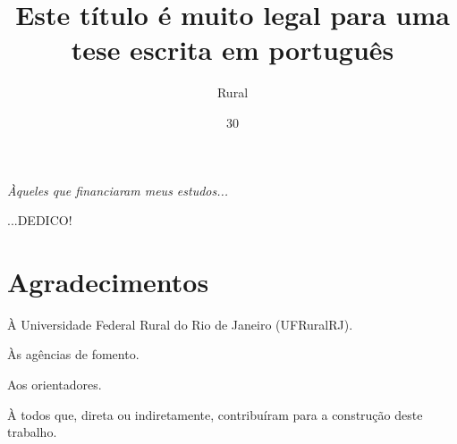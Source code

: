 \documentclass[tese]{UFRuralRJ}
\title{Este título é muito legal para uma tese escrita em português} %
\author{Rural}{Nome do Melhor Estudante da} %
\date{30}{Fevereiro}{2016} %
\begin{document}
\maketitle
\makeapprove


\clearpage\mbox{}\vfill\hspace{80mm}
\begin{minipage}{76mm}
  \begin{flushright}
    {\em
    Àqueles que financiaram meus estudos...
    \par
    ...DEDICO!
    }
  \end{flushright}
\end{minipage}


\chapter*{Agradecimentos}

À Universidade Federal Rural do Rio de Janeiro (UFRuralRJ).

Às agências de fomento.

Aos orientadores.

À todos que, direta ou indiretamente, contribuíram para a construção deste 
trabalho.
\end{document}
